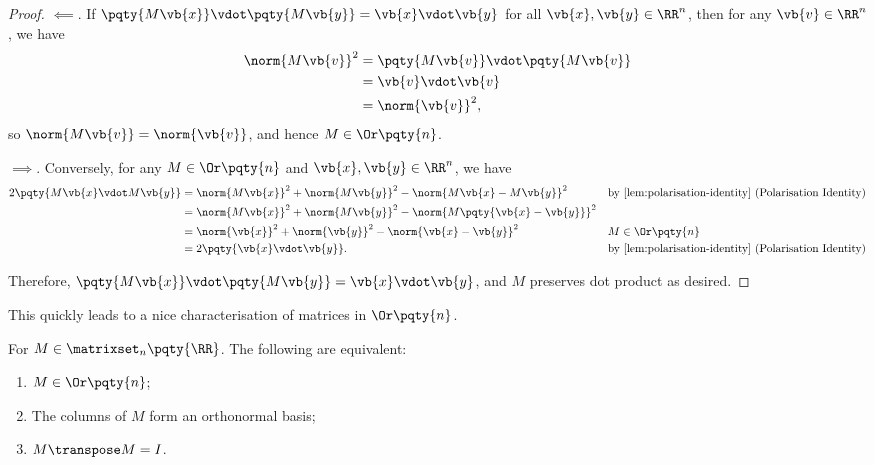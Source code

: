\begin{proof}
    \(\impliedby\). If \(\pqty{M\vb{x}} \vdot \pqty{M\vb{y}} = \vb{x} \vdot \vb{y}\) for all \(\vb{x}, \vb{y} \in \RR^n\), then for any \(\vb{v} \in \RR^n\), we have
    \begin{align*}
        \norm{M\vb{v}}^2 &= \pqty{M\vb{v}} \vdot \pqty{M\vb{v}} \\
        &=\vb{v} \vdot \vb{v} \\
        &= \norm{\vb{v}}^2,
    \end{align*}
    so \(\norm{M\vb{v}} = \norm{\vb{v}}\), and hence \(M \in \Or\pqty{n}\).

    \(\implies\). Conversely, for any \(M \in \Or\pqty{n}\) and \(\vb{x}, \vb{y} \in \RR^n\), we have
    \begin{align*}
        2 \pqty{M\vb{x} \vdot M\vb{y}} &= \norm{M\vb{x}}^2 + \norm{M\vb{y}}^2 - \norm{M\vb{x} - M\vb{y}}^2 && \text{by \autoref{lem:polarisation-identity} (Polarisation Identity)} \\
        &= \norm{M\vb{x}}^2 + \norm{M\vb{y}}^2 - \norm{M \pqty{\vb{x} - \vb{y}}}^2 \\
        &= \norm{\vb{x}}^2 + \norm{\vb{y}}^2 - \norm{\vb{x} - \vb{y}}^2 && M \in \Or\pqty{n} \\
        &= 2 \pqty{\vb{x} \vdot \vb{y}}. && \text{by \autoref{lem:polarisation-identity} (Polarisation Identity)}
    \end{align*}

    Therefore, \(\pqty{M\vb{x}} \vdot \pqty{M\vb{y}} = \vb{x} \vdot \vb{y}\), and \(M\) preserves dot product as desired.
\end{proof}

This quickly leads to a nice characterisation of matrices in \(\Or\pqty{n}\).

\begin{lemma}
    \label{lem:orthogonal-matrices-orthonormal-transpose}%
    For \(M \in \matrixset_n \pqty{\RR}\). The following are equivalent:
    \begin{enumerate}
        \item \(M \in \Or\pqty{n}\);
        \item The columns of \(M\) form an orthonormal basis;
        \item \(M\transpose M = I\).
    \end{enumerate}
\end{lemma}

